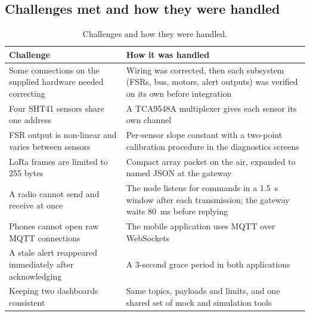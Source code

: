 \subsection{Challenges met and how they were handled}
{\small{}
\begin{table}[H]
\centering
\begin{tabularx}{\textwidth}{@{}>{\raggedright\arraybackslash}p{5.4cm}X@{}}
\toprule
\textbf{Challenge} & \textbf{How it was handled}\\
\midrule
Some connections on the supplied hardware needed correcting & Wiring was corrected, then each subsystem (FSRs, \itwoc{} bus, motors, alert outputs) was verified on its own before integration\\
Four SHT41 sensors share one \itwoc{} address & A TCA9548A multiplexer gives each sensor its own channel\\
FSR output is non-linear and varies between sensors & Per-sensor slope constant with a two-point calibration procedure in the diagnostics screens\\
LoRa frames are limited to 255 bytes & Compact array packet on the air, expanded to named JSON at the gateway\\
A radio cannot send and receive at once & The node listens for commands in a 1.5~s window after each transmission; the gateway waits 80~ms before replying\\
Phones cannot open raw MQTT connections & The mobile application uses MQTT over WebSockets\\
A stale alert reappeared immediately after acknowledging & A 3-second grace period in both applications\\
Keeping two dashboards consistent & Same topics, payloads and limits, and one shared set of mock and simulation tools\\
\bottomrule
\end{tabularx}
\caption{Challenges and how they were handled.}
\end{table}}

